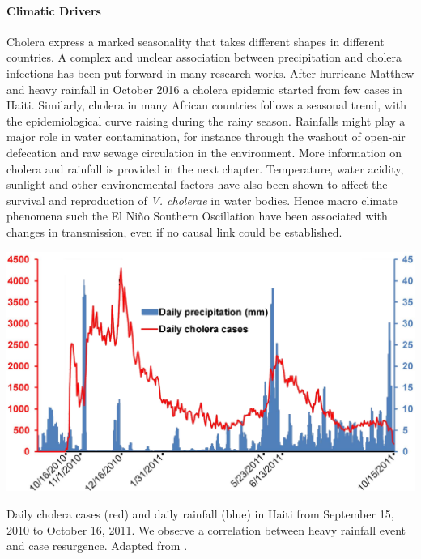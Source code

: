 \paragraph{Climatic Drivers} Cholera express a marked seasonality that takes different shapes in different countries. A complex and unclear association between precipitation and cholera infections has been put forward in many research works. After hurricane Matthew and heavy rainfall in October 2016 a cholera epidemic started from few cases in Haiti\cite{Rinaldo:Reassessment20102011:2012, Gaudart:SpatioTemporalDynamicsCholera:2013}. Similarly, cholera in many African countries follows a seasonal trend, with the epidemiological curve raising during the rainy season\cite{Baracchini:SeasonalityCholeraDynamics:2017}.  Rainfalls might play a major role in water contamination, for instance through the washout of open-air defecation and raw sewage circulation in the environment. More information on cholera and rainfall is provided in the next chapter. Temperature, water acidity, sunlight and other environemental factors have also been shown to affect the survival and reproduction of \textit{V. cholerae} in water bodies. Hence macro climate phenomena such the El Niño Southern Oscillation have been associated with changes in transmission, even if no causal link could be established\cite{Pascual:CholeraDynamicsNinoSouthern:2000}.
\begin{marginfigure}
\centering
\includegraphics[width=\textwidth]{fig/cholera-rainfall.png}
\caption[Daily cholera cases and rainfall in Haiti]{Daily cholera cases (red) and daily rainfall (blue) in Haiti from September 15, 2010 to October
16, 2011. We observe a correlation between heavy rainfall event and case resurgence. Adapted from .}
\label{rain}
\end{marginfigure}

